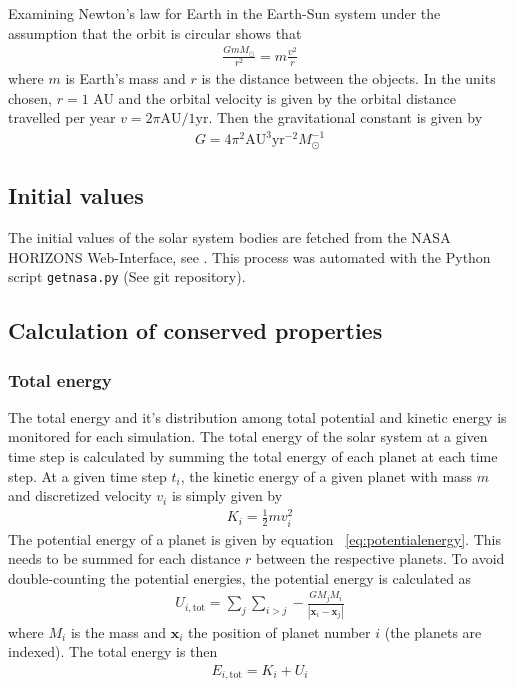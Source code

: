 \documentclass[aps,reprint]{revtex4-1}
\begin{document}
Examining Newton's law for Earth in the Earth-Sun system under the assumption
that the orbit is circular shows that
\begin{align*}
  \frac{GmM_\odot}{r^2} = m \frac{v^2}{r}
\end{align*}
where $m$ is Earth's mass and $r$ is the distance between the objects. In the
units chosen, $r = 1$ AU and the orbital velocity is given by the orbital distance
travelled per year $v = 2\pi \text{AU}/1 \text{yr}$. Then the gravitational
constant is given by
\begin{align}
  G = 4\pi^2 \text{AU}^3 \text{yr}^{-2} M_\odot^{-1}
\end{align}
\subsection{Initial values}
The initial values of the solar system bodies are fetched from the NASA HORIZONS
Web-Interface, see \cite{nasa}. This process was automated with the Python script
\texttt{getnasa.py} (See git repository).
\subsection{Calculation of conserved properties}
\subsubsection{Total energy}
The total energy and it's distribution among total potential and kinetic energy
is monitored for each simulation. The total energy of the solar system at a given time step is
calculated by summing the total energy of each planet at each time step.
At a given time step $t_i$, the kinetic energy of a given planet with mass $m$
and discretized velocity $v_i$ is simply given by
\begin{align}
  K_i = \frac{1}{2} m v_i^2
\end{align}
The potential energy of a planet is given by equation ~\ref{eq:potentialenergy}.
This needs to be summed for each distance $r$ between the respective planets. To
avoid double-counting the potential energies, the potential energy is calculated
as
\begin{align}
  U_{i, \text{tot}} = \sum_j \sum_{i > j} - \frac{G M_j M_i}{|\mathbf{x}_i - \mathbf{x}_j|}
\end{align}
where $M_i$ is the mass and $\mathbf{x}_i$ the position of planet number $i$
(the planets are indexed). The total energy is then
\begin{align}
  E_{i,\text{tot}} = K_i + U_i
\end{align}
\end{document}

